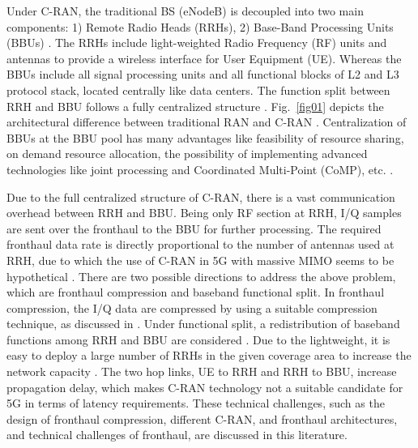 \begin{multicols}{2}
Under C-RAN, the traditional BS (eNodeB) is decoupled into two main components: 1) Remote Radio Heads (RRHs), 2) Base-Band Processing Units (BBUs) \cite{art3-key05}. The RRHs include light-weighted Radio Frequency (RF) units and antennas to provide a wireless interface for User Equipment (UE). Whereas the BBUs include all signal processing units and all functional blocks of L2 and L3 protocol stack, located centrally like data centers. The function split between RRH
and BBU follows a fully centralized structure \cite{art3-key06}. Fig.~\ref{fig01} depicts the architectural difference between traditional RAN and C-RAN \cite{art3-key07}. Centralization of BBUs at the BBU pool has many advantages like feasibility of resource sharing, on demand resource allocation, the possibility of implementing advanced technologies like joint processing and Coordinated Multi-Point (CoMP), etc. \cite{art3-key08}.


Due to the full centralized structure of C-RAN, there is a vast communication overhead between RRH and BBU. Being only RF section at RRH, I/Q samples are sent over the fronthaul to the BBU for further processing. The required fronthaul data rate is directly proportional to the number of antennas used at RRH, due to which the use of C-RAN in 5G with massive MIMO seems to be hypothetical \cite{art3-key09}. There are two possible directions to address the above problem, which are fronthaul compression and baseband functional split. In fronthaul compression, the I/Q data are compressed by using a suitable compression technique, as discussed in \cite{art3-key10}. Under functional split, a redistribution of baseband functions among RRH and BBU are considered \cite{art3-key11}. Due to the lightweight, it is easy to deploy a large number of RRHs in the given coverage area to increase the network capacity \cite{art3-key05}. The two hop links, UE to RRH and RRH to BBU, increase propagation delay, which makes C-RAN technology not a suitable candidate for 5G in terms of latency requirements. These technical challenges, such as the design of fronthaul compression, different C-RAN, and fronthaul architectures, and technical challenges of fronthaul, are discussed in this literature.


\end{multicols}
